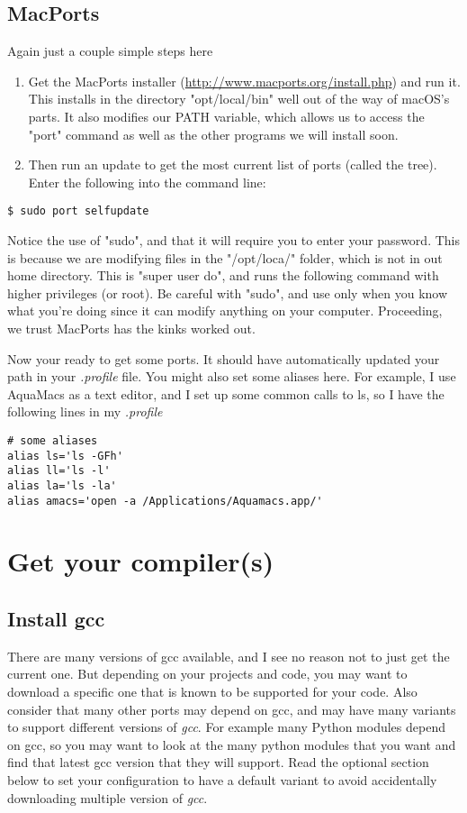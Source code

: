 \documentclass[11pt, A4paper]{article}
\begin{document}
\subsection{MacPorts}
Again just a couple simple steps here
\begin{enumerate}
	\item Get the MacPorts installer (\url{http://www.macports.org/install.php}) and run it. This installs in the directory "opt/local/bin" well out of the way of macOS's parts. It also modifies our PATH variable, which allows us to access the "port" command as well as the other programs we will install soon.
	\item Then run an update to get the most current list of ports (called the tree). Enter the following into the command line:
\end{enumerate}
\begin{lstlisting}[style=Bash]
$ sudo port selfupdate
\end{lstlisting}
Notice the use of "sudo", and that it will require you to enter your password. This is because we are modifying files in the "/opt/loca/" folder, which is not in out home directory. This is "super user do", and runs the following command with higher privileges (or root). Be careful with "sudo", and use only when you know what you're doing since it can modify anything on your computer. Proceeding, we trust MacPorts has the kinks worked out.

Now your ready to get some ports. It should have automatically updated your path in your \textit{.profile} file. You might also set some aliases here.  For example, I use AquaMacs as a text editor, and I set up some common calls to ls, so I have the following lines in my \textit{.profile} 
\begin{lstlisting}[backgroundcolor=\color{light-gray},basicstyle=\ttfamily,xleftmargin=.25in,xrightmargin=.25in]
# some aliases
alias ls='ls -GFh'
alias ll='ls -l'
alias la='ls -la'                         
alias amacs='open -a /Applications/Aquamacs.app/'
\end{lstlisting}



%
%
\section{Get your compiler(s)}
\subsection{Install gcc}
There are many versions of gcc available, and I see no reason not to just get the current one. But depending on your projects and code, you may want to download a specific one that is known to be supported for your code. Also consider that many other ports may depend on gcc, and may have many variants to support different versions of \textit{gcc}. For example many Python modules depend on gcc, so you may want to look at the many python modules that you want and find that latest gcc version that they will support. Read the optional section below to set your configuration to have a default variant to avoid accidentally downloading multiple version of \textit{gcc}. 
\end{document}
